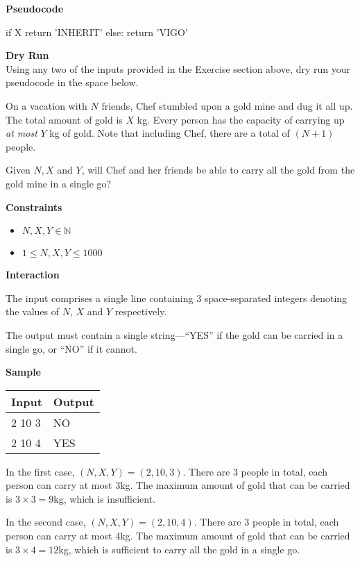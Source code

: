 \documentclass[a4paper]{exam}
\newcommand\heading[1]{\textbf{#1}}
\newcommand\inn{\in \mathbb{N}}
\begin{document}
\begin{questions}
    \heading{Pseudocode}
\begin{python}
if X %
    return 'INHERIT'
else:
    return 'VIGO'
\end{python}
    

    \heading{Dry Run}\\
    Using any two of the inputs provided in the Exercise section above, dry run your pseudocode in the space below.
    \vspace*{100pt}


    On a vacation with $N$ friends, Chef stumbled upon a gold mine and dug it all up. The total amount of gold is $X$ kg. Every person has the capacity of carrying up \textit{at most} $Y$ kg of gold. Note that including Chef, there are a total of $(N+1)$ people.

    Given $N,X$ and $Y$, will Chef and her friends be able to carry all the gold from the gold mine in a single go?


    \heading{Constraints}
    \begin{itemize}
        \item  $N,X,Y\inn$
        \item  $1\le N,X,Y\le1000$
    \end{itemize}


    \heading{Interaction}

    The input comprises a single line containing 3 space-separated integers denoting the values of $N$, $X$ and $Y$ respectively.

    The output must contain a single string---``YES'' if the gold can be carried in a single go, or ``NO'' if it cannot.

    \heading{Sample}

    \begin{tabularx}{\textwidth}{|X|X|}
        \rowcolor{gray!50}
        \hline
        Input  & Output \\ \hline\hline
        2 10 3 & NO     \\\hline
        2 10 4 & YES    \\\hline
    \end{tabularx}

    In the first case, $(N,X,Y) = (2,10,3)$. There are $3$ people in total, each person can carry at most  $3$kg. The maximum amount of gold that can be carried is $3\times3=9$kg, which is insufficient.

    In the second case, $(N,X,Y) = (2,10,4)$. There are $3$ people in total, each person can carry at most  $4$kg. The maximum amount of gold that can be carried is $3\times4=12$kg, which is sufficient to carry all the gold in a single go.


\end{questions}
\end{document}
